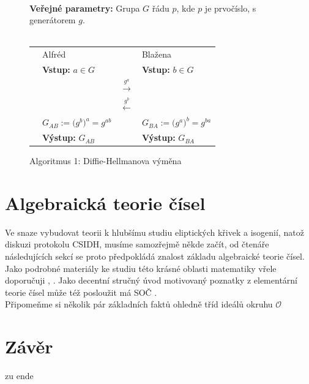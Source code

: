 \documentclass [12pt]{report}
\begin{document}
\begin{figure}[h]
\begin{center} 
\makebox[1cm]{\rule{15cm}{0.4pt}}\\
\hspace{-1.35cm} \textbf{Veřejné parametry:} Grupa $G$ řádu $p$, kde $p$ je prvočíslo, s generátorem $g$.\\

\vspace{-0.25cm}
\makebox[\linewidth]{\rule{15cm}{0.4pt}}\\
\vspace{0.2cm}
\begin{tabular}{l l c l}
\cline{2-2} \cline{4-4} 
& Alfréd & & Blažena \\ 
\cline{2-2} \cline{4-4} 
& \textbf{Vstup:} $a \in G$ & & \textbf{Vstup:} $b \in G$ \\
 & & $\stackrel{g^a}{\longrightarrow} $ &  \\
&  & $\stackrel{g^b}{\longleftarrow} $ &  \\
& $G_{AB} := \big(g^b\big)^{a} = g^{ab}$ &  & $ G_{BA} := \big(g^a\big)^{b} = g^{ba}$ \\
& \textbf{Výstup:} $G_{AB}$ & & \textbf{Výstup:} $G_{BA}$
\end{tabular}
\caption*{Algoritmus 1: Diffie-Hellmanova výměna}
\vspace{-0.8cm}
\end{center}
\end{figure}

\chapter{Algebraická teorie čísel}

Ve snaze vybudovat teorii k hlubšímu studiu eliptických křivek a isogenií, natož diskuzi protokolu CSIDH, musíme samozřejmě někde začít, od čtenáře následujících sekcí se proto předpokládá znalost základu algebraické teorie čísel. Jako podrobné materiály ke studiu této krásné oblasti matematiky vřele doporučuji \cite{Marcus}, \cite{Rosicky}. Jako decentní stručný úvod motivovaný poznatky z elementární teorie čísel může též posloužit má SOČ \cite[kap. 2]{Pezlar}.\\

Připomeňme si několik pár základních faktů ohledně tříd ideálů okruhu $\mathcal{O}$ 
 

\chapter*{Závěr}
zu ende
\end{document}

